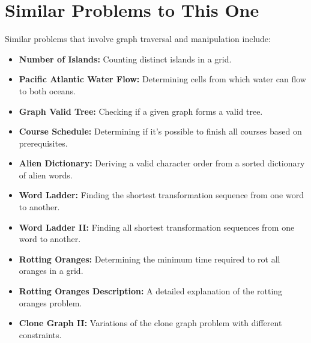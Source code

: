 \section*{Similar Problems to This One}

Similar problems that involve graph traversal and manipulation include:

\begin{itemize}
    \item \textbf{Number of Islands:} Counting distinct islands in a grid.
    
    \item \textbf{Pacific Atlantic Water Flow:} Determining cells from which water can flow to both oceans.
    
    \item \textbf{Graph Valid Tree:} Checking if a given graph forms a valid tree.
    
    \item \textbf{Course Schedule:} Determining if it's possible to finish all courses based on prerequisites.
    
    \item \textbf{Alien Dictionary:} Deriving a valid character order from a sorted dictionary of alien words.
    
    \item \textbf{Word Ladder:} Finding the shortest transformation sequence from one word to another.
    
    \item \textbf{Word Ladder II:} Finding all shortest transformation sequences from one word to another.
    
    \item \textbf{Rotting Oranges:} Determining the minimum time required to rot all oranges in a grid.
    
    \item \textbf{Rotting Oranges Description:} A detailed explanation of the rotting oranges problem.
    
    \item \textbf{Clone Graph II:} Variations of the clone graph problem with different constraints.
\end{itemize}

